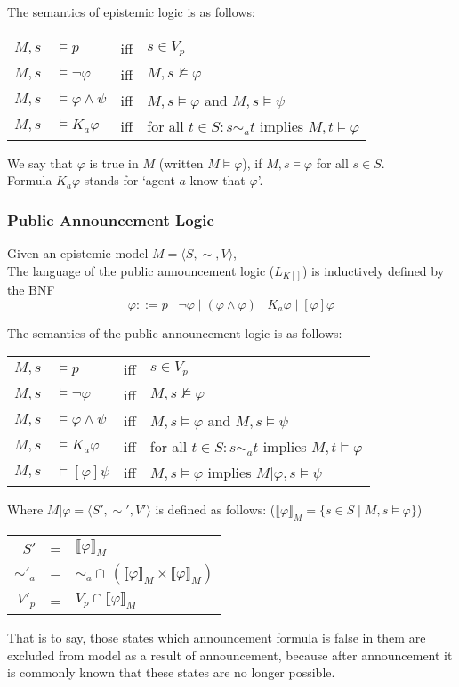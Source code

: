\documentclass{article}
\begin{document}
\noindent The semantics of epistemic logic is as follows:
\begin{center}
\begin{tabular}{r @{ } l c l}
$M,s$&$\vDash p$ &iff& $s\in V_p$\\
$M,s$&$\vDash\neg\varphi$ &iff& $M,s\nvDash\varphi$\\
$M,s$&$\vDash\varphi\land\psi$ &iff& $M,s\vDash\varphi$ and $M,s\vDash\psi$\\
$M,s$&$\vDash K_a\varphi$ &iff& for all $t\in S: s\sim_a t$ implies $M,t\vDash\varphi$\\
\end{tabular}
\end{center}
We say that $\varphi$ is true in $M$ (written $M\vDash\varphi$), if $M,s\vDash\varphi$ for all $s\in S$.\\
Formula $K_a\varphi$ stands for `agent $a$ know that $\varphi$'.

\subsubsection{Public Announcement Logic}
Given an epistemic model $M = \langle S,\sim,V\rangle$, \\

\noindent The language of the public announcement logic ($L_{K[]}$) is inductively defined by the BNF
\[\varphi ::= p \mid \neg\varphi \mid (\varphi\land\varphi) \mid K_a\varphi \mid [\varphi]\varphi\]

\noindent The semantics of the public announcement logic is as follows:
\begin{center}
\begin{tabular}{r @{ } l c l}
$M,s$&$\vDash p$ &iff& $s\in V_p$\\
$M,s$&$\vDash\neg\varphi$ &iff& $M,s\nvDash\varphi$\\
$M,s$&$\vDash\varphi\land\psi$ &iff& $M,s\vDash\varphi$ and $M,s\vDash\psi$\\
$M,s$&$\vDash K_a\varphi$ &iff& for all $t\in S: s\sim_a t$ implies $M,t\vDash\varphi$\\
$M,s$&$\vDash [\varphi]\psi$ &iff&$ M,s\vDash\varphi$ implies $M|\varphi,s\vDash\psi$
\end{tabular}
\end{center}
Where $M|\varphi=\langle S',\sim',V'\rangle$ is defined as follows: ($\llbracket\varphi\rrbracket_M = \{s\in S\mid M,s\vDash\varphi\}$)
\begin{center}
\begin{tabular}{r @{ } c @{ } l}
$S'$&=&$\llbracket\varphi\rrbracket_M$\\
$\sim'_a$&=&$\sim_a\cap\,(\llbracket\varphi\rrbracket_M\times \llbracket\varphi\rrbracket_M)$\\
$V'_p$&=&$V_p\cap \llbracket\varphi\rrbracket_M$
\end{tabular}
\end{center}
That is to say, those states which announcement formula is false in them are excluded from model as a result of announcement, because after announcement it is commonly known that these states are no longer possible.\\
\end{document}
